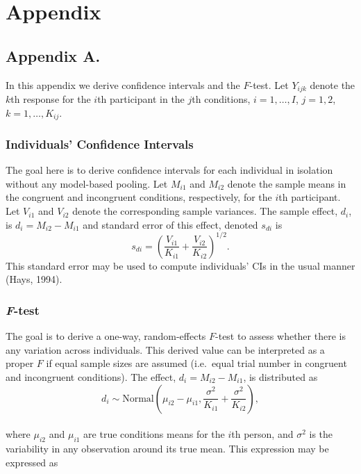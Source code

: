 \documentclass[american,man]{apa6}
\begin{document}
\section{Appendix}\label{appendix}

\subsection{Appendix A.}\label{appendix-a.}

In this appendix we derive confidence intervals and the \(F\)-test. Let
\(Y_{ijk}\) denote the \(k\)th response for the \(i\)th participant in
the \(j\)th conditions, \(i=1,\ldots,I\), \(j=1,2\),
\(k=1,\ldots, K_{ij}\).

\subsubsection{Individuals' Confidence
Intervals}\label{individuals-confidence-intervals}

The goal here is to derive confidence intervals for each individual in
isolation without any model-based pooling. Let \(M_{i1}\) and \(M_{i2}\)
denote the sample means in the congruent and incongruent conditions,
respectively, for the \(i\)th participant. Let \(V_{i1}\) and \(V_{i2}\)
denote the corresponding sample variances. The sample effect, \(d_i\),
is \(d_i=M_{i2}-M_{i1}\) and standard error of this effect, denoted
\(s_{di}\) is \[
s_{di} = \left(\frac{V_{i1}}{K_{i1}}+\frac{V_{i2}}{K_{i2}}\right)^{1/2}.
\] This standard error may be used to compute individuals' CIs in the
usual manner (Hays, 1994).

\subsubsection{\emph{F}-test}\label{f-test}

The goal is to derive a one-way, random-effects \(F\)-test to assess
whether there is any variation across individuals. This derived value
can be interpreted as a proper \(F\) if equal sample sizes are assumed
(i.e.~equal trial number in congruent and incongruent conditions). The
effect, \(d_i=M_{i2}-M_{i1}\), is distributed as \[
d_i \sim \mbox{Normal}\left(\mu_{i2}-\mu_{i1},\frac{\sigma^2}{K_{i1}}+\frac{\sigma^2}{K_{i2}}\right),
\]\\where \(\mu_{i2}\) and \(\mu_{i1}\) are true conditions means for
the \(i\)th person, and \(\sigma^2\) is the variability in any
observation around its true mean. This expression may be expressed as
\end{document}
